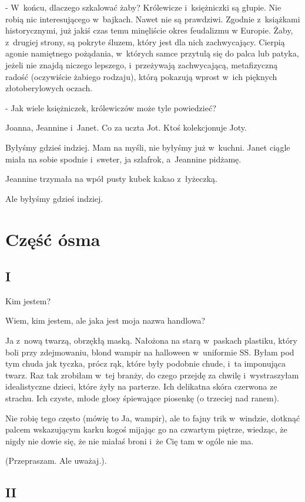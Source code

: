 \documentclass[oneside,polish,12pt,sfheadings]{mwbk}
\begin{document}
- W~końcu, dlaczego szkalować żaby? Królewicze i~księżniczki są głupie.
Nie robią nic interesującego w~bajkach. Nawet nie są prawdziwi. Zgodnie
z~książkami historycznymi, już jakiś czas temu minęliście okres feudalizmu
w Europie. Żaby, z~drugiej strony, są pokryte śluzem, który jest dla
nich zachwycający. Cierpią agonie namiętnego pożądania, w~których
samce przytulą się do palca lub patyka, jeżeli nie znajdą niczego
lepszego, i~przeżywają zachwycającą, metafizyczną radość (oczywiście
żabiego rodzaju), którą pokazują wprost w~ich pięknych złotoberylowych
oczach.

- Jak wiele księżniczek, królewiczów może tyle powiedzieć?

Joanna, Jeannine i~Janet. Co za uczta Jot. Ktoś kolekcjonuje Joty.

Byłyśmy gdzieś indziej. Mam na myśli, nie byłyśmy już w~kuchni. Janet
ciągle miała na sobie spodnie i~sweter, ja szlafrok, a~Jeannine pidżamę.

Jeannine trzymała na wpół pusty kubek kakao z~łyżeczką.

Ale byłyśmy gdzieś indziej.

\part*{Część ósma}

\chapter{I}

Kim jestem?

Wiem, kim jestem, ale jaka jest moja nazwa handlowa?

Ja z~nową twarzą, obrzękłą maską. Nałożona na starą w~paskach plastiku,
który boli przy zdejmowaniu, blond wampir na halloween w~uniformie
SS. Byłam pod tym chuda jak tyczka, prócz rąk, które były podobnie
chude, i~ta imponująca twarz. Raz tak zrobiłam w~tej branży, do czego
przejdę za chwilę i~wystraszyłam idealistyczne dzieci, które żyły
na parterze. Ich delikatna skóra czerwona ze strachu. Ich czyste,
młode głosy śpiewające piosenkę (o trzeciej nad ranem).

Nie robię tego często (mówię to Ja, wampir), ale to fajny trik w~windzie,
dotknąć palcem wskazującym karku kogoś mijając go na czwartym piętrze,
wiedząc, że nigdy nie dowie się, że nie miałaś broni i~że Cię tam
w ogóle nie ma.

(Przepraszam. Ale uważaj.).

\chapter{II}
\end{document}

